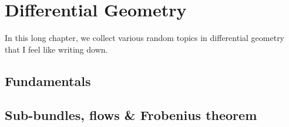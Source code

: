 \chapter{Differential Geometry}


In this long chapter, we collect various random topics in differential geometry that I feel like writing down.


\section{Fundamentals} 




\section{Sub-bundles, flows \& Frobenius theorem} 


